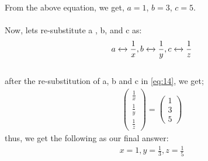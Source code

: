 \documentclass[journal,12.00pt,twocolumn]{IEEEtran}
\newcommand{\myvec}[1]{\ensuremath{\begin{pmatrix}#1\end{pmatrix}}}
\begin{document}
From the above equation, we get, $a=1$, $b=3$, $c=5$.\\
\medskip\\
Now, lets re-substitute a , b, and c as:\\
\begin{align}
    a\xleftrightarrow[]{}\frac{1}{x}, b\xleftrightarrow[]{}\frac{1}{y}, c\xleftrightarrow[]{}\frac{1}{z}
\end{align}
\medskip\\
after the re-substitution of a, b and c in \eqref{eq:14}, we get;\\
\begin{align}
    \myvec{\frac{1}{x}\\\frac{1}{y}\\\frac{1}{z}}= \myvec{ 1 \\ 3 \\ 5}
\end{align}
thus, we get the following as our final answer:
\begin{align}
  x=1, y=\frac{1}{3}, z=\frac{1}{5}
\end{align}
\end{document}
